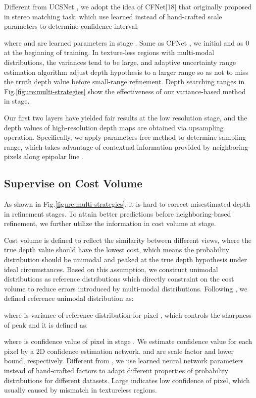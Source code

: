 \documentclass{article}
\begin{document}
Different from UCSNet \cite{cheng2020deep}, we adopt the idea of CFNet[18] that originally proposed in stereo matching task, which use learned instead of hand-crafted scale parameters to determine confidence interval:

where  and  are learned parameters in stage . Same as CFNet \cite{shen2021cfnet}, we initial  and  as 0 at the beginning of training.
In texture-less regions with multi-modal distributions, the variances tend to be large, and adaptive uncertainty range estimation algorithm adjust depth hypothesis to a larger range so as not to miss the truth depth value before small-range refinement.
Depth searching ranges in Fig.\ref{figure:multi-strategies} show the effectiveness of our variance-based method in  stage.

Our first two layers have yielded fair results at the low resolution stage, and the depth values of high-resolution depth maps are obtained via upsampling operation.
Specifically, we apply parameters-free method to determine sampling range, which takes advantage of contextual information provided by neighboring pixels along epipolar line \cite{yang2020cost}.

\subsection{Supervise on Cost Volume}
As shown in Fig.\ref{figure:multi-strategies}, it is hard to correct misestimated depth in refinement stages.
To attain better predictions before neighboring-based refinement, we further utilize the information in cost volume at  stage.

Cost volume is defined to reflect the similarity between different views, where the true depth value should have the lowest cost, which means the probability distribution should be unimodal and peaked at the true depth hypothesis under ideal circumstances.
Based on this assumption, we construct unimodal distributions as reference distributions which directly constraint on the cost volume to reduce errors introduced by multi-modal distributions.
Following \cite{zhang2020adaptive}, we defined reference unimodal distribution as:

where  is variance of reference distribution for pixel , which controls the sharpness of peak and it is defined as:

where  is confidence value of pixel  in stage .
We estimate confidence value for each pixel by a 2D confidence estimation network.  and  are scale factor and lower bound, respectively.
Different from \cite{zhang2020adaptive}, we use learned neural network parameters instead of hand-crafted factors to adapt different properties of probability distributions for different datasets. 
Large  indicates low confidence of pixel, which usually caused by mismatch in textureless regions.
\end{document}
